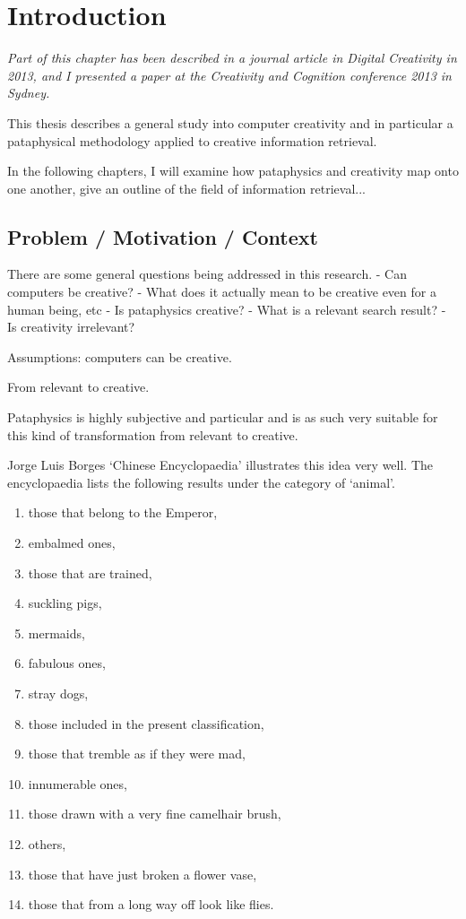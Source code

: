 
\chapter{Introduction}
\label{ch:intro}

\emph{Part of this chapter has been described in a journal article in Digital Creativity in 2013, and I presented a paper at the Creativity and Cognition conference 2013 in Sydney.} 

\grule


This thesis describes a general study into computer creativity and in particular a pataphysical methodology applied to creative information retrieval.


In the following chapters, I will examine how pataphysics and creativity map onto one another, give an outline of the field of information retrieval...

\section{Problem / Motivation / Context}

There are some general questions being addressed in this research.
- Can computers be creative?
- What does it actually mean to be creative even for a human being, etc
- Is pataphysics creative?
- What is a relevant search result?
- Is creativity irrelevant?

Assumptions: computers can be creative.

From relevant to creative.

Pataphysics is highly subjective and particular and is as such very suitable for this kind of transformation from relevant to creative.

Jorge Luis Borges ‘Chinese Encyclopaedia' \citep{Borges2000} illustrates this idea very well. The encyclopaedia lists the following results under the category of ‘animal'.

\begin{enumerate}
  \item those that belong to the Emperor,
  \item embalmed ones,
  \item those that are trained,
  \item suckling pigs,
  \item mermaids,
  \item fabulous ones,
  \item stray dogs,
  \item those included in the present classification,
  \item those that tremble as if they were mad,
  \item innumerable ones,
  \item those drawn with a very fine camelhair brush,
  \item others,
  \item those that have just broken a flower vase,
  \item those that from a long way off look like flies.
\end{enumerate}

